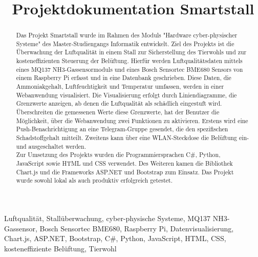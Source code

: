 \documentclass[conference]{IEEEtran}
\begin{document}
\title{Projektdokumentation Smartstall\\
}

\author{
\and
{}
}

\maketitle

\begin{abstract}
Das Projekt Smartstall wurde im Rahmen des Moduls "Hardware cyber-physischer Systeme" des Master-Studiengangs Informatik entwickelt. Ziel des Projekts ist die Überwachung der Luftqualität in einem Stall zur Sicherstellung des Tierwohls und zur kosteneffizienten Steuerung der Belüftung. Hierfür werden Luftqualitätsdaten mittels eines MQ137 NH3-Gassensormoduls und eines Bosch Sensortec BME680 Sensors von einem Raspberry Pi erfasst und in eine Datenbank geschrieben. Diese Daten, die Ammoniakgehalt, Luftfeuchtigkeit und Temperatur umfassen, werden in einer Webanwendung visualisiert. Die Visualisierung erfolgt durch Liniendiagramme, die Grenzwerte anzeigen, ab denen die Luftqualität als schädlich eingestuft wird. Überschreiten die gemessenen Werte diese Grenzwerte, hat der Benutzer die Möglichkeit, über die Webanwendung zwei Funktionen zu aktivieren. Erstens wird eine Push-Benachrichtigung an eine Telegram-Gruppe gesendet, die den spezifischen Schadstoffgehalt mitteilt. Zweitens kann über eine WLAN-Steckdose die Belüftung ein- und ausgeschaltet werden. \\
Zur Umsetzung des Projekts wurden die Programmiersprachen C\#, Python, JavaScript sowie HTML und CSS verwendet. Des Weiteren kamen die Bibliothek Chart.js und die Frameworks ASP.NET und Bootstrap zum Einsatz. Das Projekt wurde sowohl lokal als auch produktiv erfolgreich getestet.
\end{abstract}

\begin{IEEEkeywords}
Luftqualität, Stallüberwachung, cyber-physische Systeme, MQ137 NH3-Gassensor, Bosch Sensortec BME680, Raspberry Pi, Datenvisualisierung, Chart.js, ASP.NET, Bootstrap, C\#, Python, JavaScript, HTML, CSS, kosteneffiziente Belüftung, Tierwohl
\end{IEEEkeywords}
\end{document}
